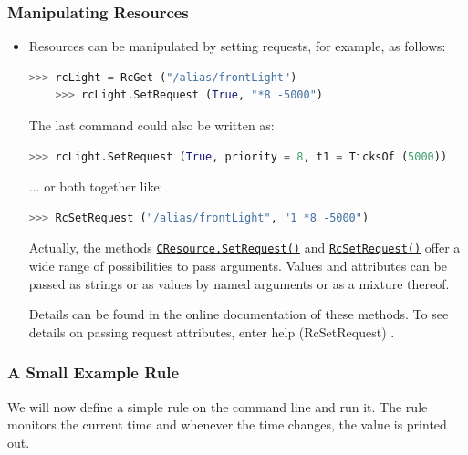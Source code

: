 \documentclass[12pt,english,parskip=half,headheight=19pt]{scrreprt}
\newcommand{\lstf}[1]{\colorbox{lstbackground}{\ttfamily\footnotesize#1}}
\newcommand{\refapipython}[1]{\href{home2l-api_python/index.html}{\mbox{\texttt{#1}}}}  %
\begin{document}
\subsubsection*{Manipulating Resources}

\begin{itemize}[$\blacktriangleright$]

\item
  Resources can be manipulated by setting requests, for example, as follows:
  \begin{lstlisting}[language=python]
    >>> rcLight = RcGet ("/alias/frontLight")
    >>> rcLight.SetRequest (True, "*8 -5000")
  \end{lstlisting}
  The last command could also be written as:
  \begin{lstlisting}[language=python]
    >>> rcLight.SetRequest (True, priority = 8, t1 = TicksOf (5000))
  \end{lstlisting}
  ... or both together like:
  \begin{lstlisting}[language=python]
  >>> RcSetRequest ("/alias/frontLight", "1 *8 -5000")
  \end{lstlisting}
  Actually, the methods \refapipython{CResource.SetRequest()} and \refapipython{RcSetRequest()}
  offer a wide range of possibilities to pass arguments. Values and attributes can be passed as strings
  or as values by named arguments or as a mixture thereof.

  Details can be found in the online documentation of these methods. To see details on passing
  request attributes, enter \lstf{help (RcSetRequest)} .

\end{itemize}



\subsubsection*{A Small Example Rule}

We will now define a simple rule on the command line and run it.
The rule monitors the current time and whenever the time changes, the value is printed out.
\end{document}
